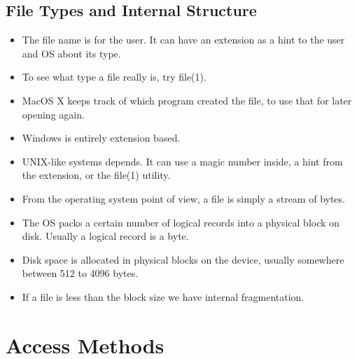 \documentclass{beamer}
\begin{document}
\subsection{File Types and Internal Structure}

\begin{frame}{\insertsubsectionhead}
  \begin{itemize}
    \item The file name is for the user.
      It can have an extension as a hint to the user and OS about its type.

    \item To see what type a file really is, try file(1).

    \item MacOS X keeps track of which program created the file, to use that 
      for later opening again.

    \item Windows is entirely extension based.

    \item UNIX-like systems depends.
      It can use a magic number inside, a hint from the extension, or the 
      file(1) utility.

  \end{itemize}
\end{frame}

\begin{frame}{\insertsubsectionhead}
  \begin{itemize}
    \item From the operating system point of view, a file is simply a stream of 
      bytes.

    \item The OS packs a certain number of logical records into a physical 
      block on disk.
      Usually a logical record is a byte.

    \item Disk space is allocated in physical blocks on the device, usually 
      somewhere between 512 to 4096 bytes.

    \item If a file is less than the block size we have internal fragmentation.

  \end{itemize}
\end{frame}


\section{Access Methods}
\end{document}
